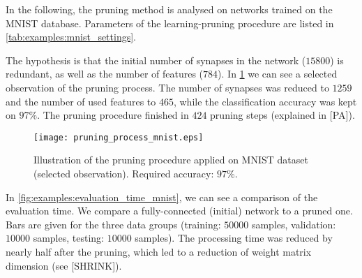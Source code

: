 In the following, the pruning method is analysed on networks trained on the MNIST database. Parameters of the learning-pruning procedure are listed in \cref{tab:examples:mnist_settings}.

\begin{table}[H]
\centering
{}
\caption{Experiment settings for the MNIST example.}
\label{tab:examples:mnist_settings}
\end{table}

The hypothesis is that the initial number of synapses in the network ($ 15800 $) is redundant, as well as the number of features ($ 784 $). In \cref{fig:examples:pruning_process_mnist} we can see a selected observation of the pruning process. The number of synapses was reduced to $ 1259 $ and the number of used features to $ 465 $, while the classification accuracy was kept on $ 97\% $. The pruning procedure finished in $ 424 $ pruning steps (explained in [PA]).

\begin{figure}[H]
\centering
\texttt{[image: pruning\_process\_mnist.eps]}
\caption{Illustration of the pruning procedure applied on MNIST dataset (selected observation). Required accuracy: $ 97\% $.}
\label{fig:examples:pruning_process_mnist}
\end{figure}

In \cref{fig:examples:evaluation_time_mnist}, we can see a comparison of the evaluation time. We compare a fully-connected (initial) network to a pruned one. Bars are given for the three data groups (training: $ 50000 $ samples, validation: $ 10000 $ samples, testing: $ 10000 $ samples). The processing time was reduced by nearly half after the pruning, which led to a reduction of weight matrix dimension (see [SHRINK]).

